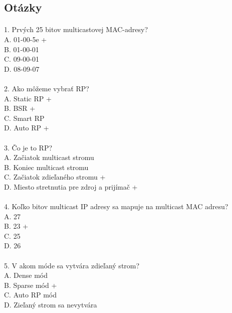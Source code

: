 \documentclass[12pt,twoside,a4paper]{report}
\begin{document}
\subsection{Otázky}
\paragraph{}
1. Prvých 25 bitov multicastovej MAC-adresy?\\
A. 01-00-5e +\\
B. 01-00-01\\
C. 09-00-01\\
D. 08-09-07\\

\paragraph{}
2. Ako môžeme vybrať RP?\\
A. Static RP +\\
B. BSR +\\
C. Smart RP\\
D. Auto RP +\\

\paragraph{}
3. Čo je to RP?\\
A. Začiatok multicast stromu\\
B. Koniec multicast stromu\\
C. Začiatok zdieľaného stromu +\\
D. Miesto stretnutia pre zdroj a prijímač +\\

\paragraph{}
4. Koľko bitov multicast IP adresy sa mapuje na multicast MAC adresu?\\
A. 27\\
B. 23 +\\
C. 25\\
D. 26\\

\paragraph{}
5. V akom móde sa vytvára zdieľaný strom?\\
A. Dense mód\\
B. Sparse mód +\\
C. Auto RP mód\\
D. Zieľaný strom sa nevytvára\\
\end{document}
